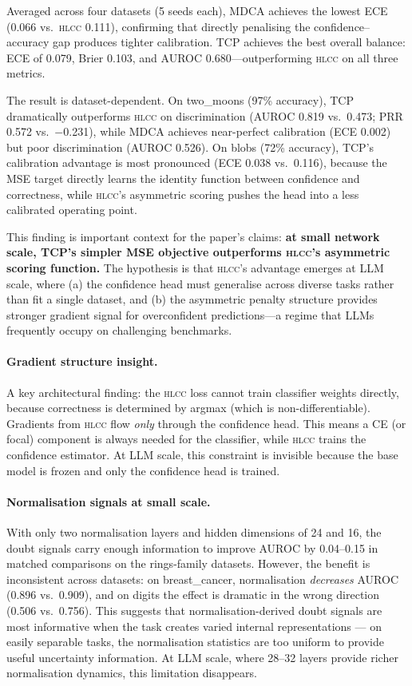 \documentclass[11pt,a4paper]{article}
\newcommand{\hlcc}{\textsc{hlcc}}
\begin{document}
Averaged across four datasets (5 seeds each), MDCA achieves the
lowest ECE (0.066 vs.\ \hlcc{} 0.111), confirming that directly
penalising the confidence--accuracy gap produces tighter calibration.
TCP achieves the best overall balance: ECE of 0.079, Brier 0.103,
and AUROC 0.680---outperforming \hlcc{} on all three metrics.

The result is dataset-dependent.  On two\_moons (97\% accuracy), TCP
dramatically outperforms \hlcc{} on discrimination (AUROC 0.819 vs.\
0.473; PRR 0.572 vs.\ $-$0.231), while MDCA achieves near-perfect
calibration (ECE 0.002) but poor discrimination (AUROC 0.526).  On
blobs (72\% accuracy), TCP's calibration advantage is most pronounced
(ECE 0.038 vs.\ 0.116), because the MSE target directly learns the
identity function between confidence and correctness, while \hlcc{}'s
asymmetric scoring pushes the head into a less calibrated operating
point.

This finding is important context for the paper's claims: \textbf{at
small network scale, TCP's simpler MSE objective outperforms \hlcc{}'s
asymmetric scoring function.}  The hypothesis is that \hlcc{}'s
advantage emerges at LLM scale, where (a) the confidence head must
generalise across diverse tasks rather than fit a single dataset, and
(b) the asymmetric penalty structure provides stronger gradient signal
for overconfident predictions---a regime that LLMs frequently occupy
on challenging benchmarks.

\paragraph{Gradient structure insight.}
A key architectural finding: the \hlcc{} loss cannot train classifier
weights directly, because correctness is determined by argmax (which
is non-differentiable).  Gradients from \hlcc{} flow \emph{only}
through the confidence head.  This means a CE (or focal) component is
always needed for the classifier, while \hlcc{} trains the confidence
estimator.  At LLM scale, this constraint is invisible because the
base model is frozen and only the confidence head is trained.

\paragraph{Normalisation signals at small scale.}
With only two normalisation layers and hidden dimensions of 24 and
16, the doubt signals carry enough information to improve AUROC by
0.04--0.15 in matched comparisons on the rings-family datasets.
However, the benefit is inconsistent across datasets: on
breast\_cancer, normalisation \emph{decreases} AUROC
(0.896 vs.\ 0.909), and on digits the effect is dramatic in the wrong
direction (0.506 vs.\ 0.756).  This suggests that normalisation-derived
doubt signals are most informative when the task creates varied internal
representations --- on easily separable tasks, the normalisation
statistics are too uniform to provide useful uncertainty information.
At LLM scale, where 28--32 layers provide richer normalisation dynamics,
this limitation disappears.
\end{document}

